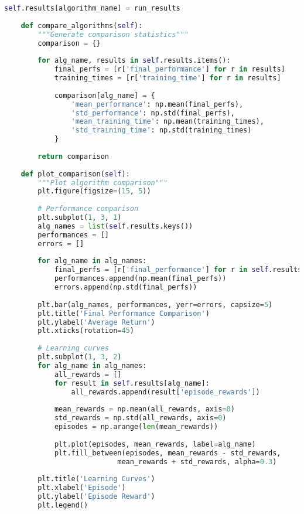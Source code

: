 \begin{lstlisting}[language=Python, caption=Algorithm Comparison]
        self.results[algorithm_name] = run_results
    
    def compare_algorithms(self):
        """Generate comparison statistics"""
        comparison = {}
        
        for alg_name, results in self.results.items():
            final_perfs = [r['final_performance'] for r in results]
            training_times = [r['training_time'] for r in results]
            
            comparison[alg_name] = {
                'mean_performance': np.mean(final_perfs),
                'std_performance': np.std(final_perfs),
                'mean_training_time': np.mean(training_times),
                'std_training_time': np.std(training_times)
            }
        
        return comparison
    
    def plot_comparison(self):
        """Plot algorithm comparison"""
        plt.figure(figsize=(15, 5))
        
        # Performance comparison
        plt.subplot(1, 3, 1)
        alg_names = list(self.results.keys())
        performances = []
        errors = []
        
        for alg_name in alg_names:
            final_perfs = [r['final_performance'] for r in self.results[alg_name]]
            performances.append(np.mean(final_perfs))
            errors.append(np.std(final_perfs))
        
        plt.bar(alg_names, performances, yerr=errors, capsize=5)
        plt.title('Final Performance Comparison')
        plt.ylabel('Average Return')
        plt.xticks(rotation=45)
        
        # Learning curves
        plt.subplot(1, 3, 2)
        for alg_name in alg_names:
            all_rewards = []
            for result in self.results[alg_name]:
                all_rewards.append(result['episode_rewards'])
            
            mean_rewards = np.mean(all_rewards, axis=0)
            std_rewards = np.std(all_rewards, axis=0)
            episodes = np.arange(len(mean_rewards))
            
            plt.plot(episodes, mean_rewards, label=alg_name)
            plt.fill_between(episodes, mean_rewards - std_rewards, 
                           mean_rewards + std_rewards, alpha=0.3)
        
        plt.title('Learning Curves')
        plt.xlabel('Episode')
        plt.ylabel('Episode Reward')
        plt.legend()
        

\end{lstlisting}
